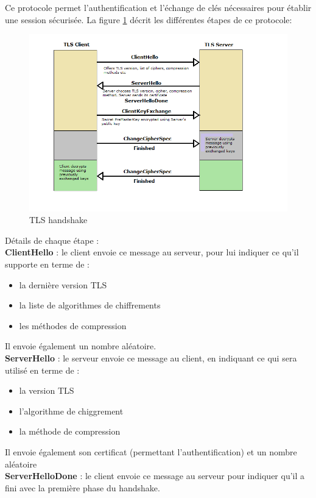 Ce protocole permet l'authentification et l'échange de clés nécessaires pour établir une session sécurisée. La figure \ref{handshake} décrit les différentes étapes de ce protocole:
\begin{figure}[H]
  \centering
  \includegraphics[scale=0.6]{img/tls-handshake.png}
  \caption{TLS handshake}
  \label{handshake}
\end{figure}  

Détails de chaque étape :\\


\textbf{ClientHello} : le client envoie ce message au serveur, pour lui indiquer ce qu'il supporte en terme de  :
\begin{itemize}
\item la dernière version TLS 
\item la liste de algorithmes de chiffrements  
\item les méthodes de compression
\end{itemize}
Il envoie également un nombre aléatoire.\\


\textbf{ServerHello} : le serveur envoie ce message au client, en indiquant ce qui sera utilisé en terme de : 
\begin{itemize}
\item la version TLS
\item l'algorithme de chiggrement
\item la méthode de compression
\end{itemize}
Il envoie également son certificat (permettant l'authentification) et un nombre aléatoire\\

\textbf{ServerHelloDone} : le client envoie ce message au serveur pour indiquer qu'il a fini avec la première phase du handshake.\\

